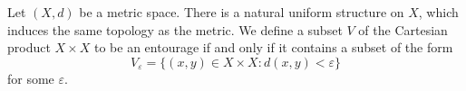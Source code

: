 \documentclass[12pt]{article}
\begin{document}
Let $(X,d)$ be a metric space. There is a natural uniform structure on $X$, which induces the same topology as the metric. We define a subset $V$ of the Cartesian product $X \times X$ to be an entourage if and only if it contains a subset of the form
\[ V_{\varepsilon} = \{ (x,y) \in X \times X : d(x,y) < \varepsilon\} \]
for some $\varepsilon$.
\end{document}
